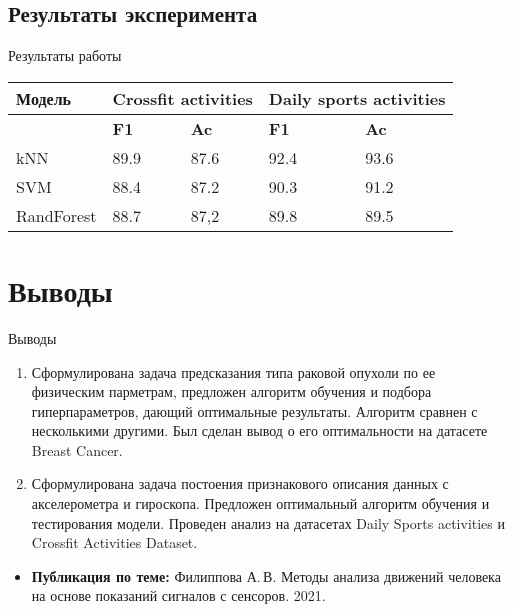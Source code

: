 \documentclass[unicode]{beamer}
\begin{document}
\subsection{Результаты эксперимента}
\begin{frame}{Результаты работы}
    \vspace{3pt}\begin{centering}
        \begin{small}
            \begin{tabular}{|p{50pt}||p{40pt}|p{40pt}||p{40pt}|p{40pt}|}
                \hline
                \textbf{Модель} & \multicolumn{2}{|c||}{\textbf{Crossfit activities}} & \multicolumn{2}{|c|}{\textbf{Daily sports activities}} \\
                \hline
                & \textbf{F1} & \textbf{Ac} & \textbf{F1}& \textbf{Ac} \\
                \hline
                kNN & 89.9 & 87.6 & 92.4 & 93.6\\
                \hline
                SVM & 88.4 & 87.2 & 90.3 & 91.2 \\
                \hline
                RandForest & 88.7 & 87,2 & 89.8 & 89.5 \\
                \hline
            \end{tabular}
        \end{small}
    \end{centering}
    \vspace{-12pt}\begin{figure}
         \begin{centering}
        \end{centering}
    \end{figure}
\end{frame}

\section{Выводы}
\begin{frame}{Выводы}
    \begin{enumerate}
        \item Сформулирована задача предсказания типа раковой опухоли по ее физическим парметрам, предложен алгоритм обучения и подбора гиперпараметров, дающий оптимальные результаты.
        Алгоритм сравнен с несколькими другими. Был сделан вывод о его оптимальности на датасете Breast Cancer.
        \item Сформулирована задача постоения признакового описания данных с акселерометра и гироскопа. Предложен оптимальный алгоритм обучения и тестирования модели.
        Проведен анализ на датасетах  Daily Sports activities и Crossfit Activities Dataset.
    \end{enumerate}

    \begin{itemize}
        \item
            \textbf{Публикация по теме:} Филиппова А.\,В. Методы анализа движений человека на
            основе показаний сигналов с сенсоров. 2021.
    \end{itemize}
\end{frame}
\end{document}
